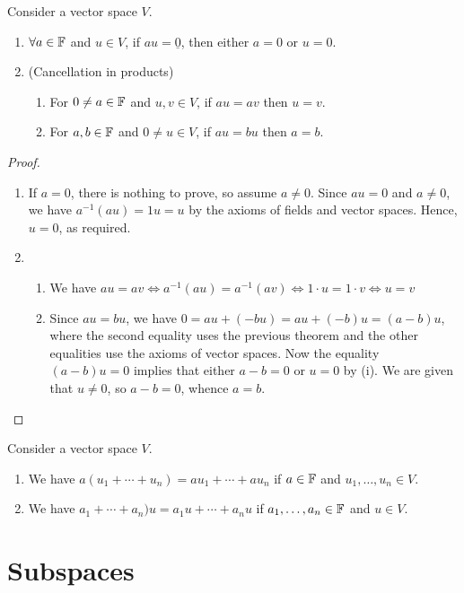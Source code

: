 \begin{mythm}\normalfont
Consider a vector space \(V\).
\begin{enumerate}
	\item \(\forall a\in\mathbb{F}\) and \(u\in V\), if \(au=\underline{0}\), then either \(a=0\) or \(u=0\).
	\item (Cancellation in products)
		\begin{enumerate}
			\item For \(0\ne a\in\mathbb{F}\) and \(u,v\in V\), if \(au=av\) then \(u=v\).
			\item For \(a,b\in\mathbb{F}\) and \(0\ne u\in V\), if \(au=bu\) then \(a=b\).
		\end{enumerate}
\end{enumerate}
\end{mythm}

\begin{proof}
\begin{enumerate}
	\item If \(a=0\), there is nothing to prove, so assume \(a\ne0\). Since \(au=0\) and \(a\ne0\), we have \(a^{-1}(au)=1u=u\) by the axioms of fields and vector spaces. Hence, \(u=0\), as required.
	\item \begin{enumerate}
		\item  We have \(au=av \Leftrightarrow a^{-1}(au)=a^{-1}(av) \Leftrightarrow 1\cdot u = 1\cdot v \Leftrightarrow u=v\)
		\item Since \(au=bu\), we have \(0=au+(-bu)=au+(-b)u=(a-b)u\), where the second equality uses the previous theorem and the other equalities use the axioms of vector spaces. Now the equality \((a-b)u=0\) implies that either \(a-b=0\) or \(u=0\) by (i). We are given that \(u \ne 0\), so \(a-b=0\), whence \(a=b\).
	\end{enumerate}
\end{enumerate}
\end{proof}

\begin{mythm}\normalfont
Consider a vector space \(V\).
\begin{enumerate}
	\item We have \(a(u_1+\dotsb+u_n) = au_1 + \dotsb+au_n\) if \(a\in\mathbb{F}\) and \(u_1,\dotsc,u_n\in V\).
	\item We have \(a_1 + \dotsb + a_n)u=a_1 u + \dotsb + a_n u\) if \(a_1,\dotsc,a_n\in\mathbb{F}\) and \(u\in V\).
\end{enumerate}
\end{mythm}

\section{Subspaces}





